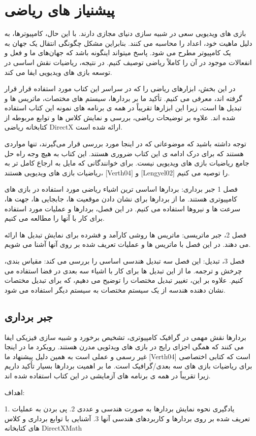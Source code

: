 
\def \Session {1}
\setcounter{chapter}{\Session-1}

\part{پیشنیاز های ریاضی}

{
بازی های ویدیویی سعی در شبیه سازی دنیای مجازی دارند.
با این حال، کامپیوترها، به دلیل ماهیت خود، اعداد را محاسبه می کنند. بنابراین مشکل چگونگی انتقال یک جهان به یک کامپیوتر مطرح می شود.
پاسخ میتواند اینگونه باشد که جهان‌های ما و فعل و انفعالات موجود در آن را کاملاً ریاضی توصیف کنیم. در نتیجه، ریاضیات نقش اساسی در توسعه بازی های ویدیویی ایفا می کند.

در این بخش، ابزارهای ریاضی را که در سراسر این کتاب مورد استفاده قرار قرار گرفته اند، معرفی می کنیم. تأکید ما بر بردارها، سیستم های مختصات، ماتریس ها و تبدیل ها است، زیرا این ابزارها تقریباً در همه ی برنامه های نمونه این کتاب استفاده شده اند.
علاوه بر توضیحات ریاضی، بررسی و نمایش کلاس ها و توابع مربوطه از کتابخانه ریاضی DirectX ارائه شده است.

توجه داشته باشید که موضوعاتی که در اینجا مورد بررسی قرار می‌گیرند، تنها مواردی هستند که برای درک ادامه ی این کتاب ضروری هستند.
این کتاب به هیچ وجه راه حل جامع ریاضیات بازی های ویدیویی نیست.
برای خوانندگانی که مایل به ارجاع کامل تر به ریاضیات بازی های ویدیویی هستند، [Verth04] و [Lengyel02] را توصیه می کنیم.
}
{
فصل 1 جبر برداری: بردارها اساسی ترین اشیاء ریاضی مورد استفاده در بازی های کامپیوتری هستند.
ما از بردارها برای نشان دادن موقعیت ها، جابجایی ها، جهت ها، سرعت ها و نیروها استفاده می کنیم.
در این فصل، بردارها و عملیات مورد استفاده برای کار با آنها را مطالعه می کنیم.

فصل 2، جبر ماتریسی: ماتریس ها روشی کارآمد و فشرده برای نمایش تبدیل ها ارائه می دهند.
در این فصل با ماتریس ها و عملیات تعریف شده بر روی آنها آشنا می شویم.

فصل 3، تبدیل: این فصل سه تبدیل هندسی اساسی را بررسی می کند: مقیاس بندی، چرخش و ترجمه.
ما از این تبدیل ها برای کار با اشیاء سه بعدی در فضا استفاده می کنیم.
علاوه بر این، تغییر تبدیل مختصات را توضیح می دهیم، که برای تبدیل مختصات نشان دهنده هندسه از یک سیستم مختصات به سیستم دیگر استفاده می شود.
}

\chapter{جبر برداری}

{
بردارها نقش مهمی در گرافیک کامپیوتری، تشخیص برخورد و شبیه سازی فیزیکی ایفا می کنند که همگی اجزای رایج در بازی های ویدئویی مدرن هستند.
رویکرد ما در اینجا غیر رسمی و عملی است به همین دلیل پیشنهاد ما [Verth04] است که کتابی اختصاصی برای ریاضیات بازی های سه بعدی/گرافیک است.
ما بر اهمیت بردارها بسیار تأکید داریم زیرا تقریباً در همه ی برنامه های آزمایشی در این کتاب استفاده شده اند.

اهداف:

1. یادگیری نحوه نمایش بردارها به صورت هندسی و عددی
2. پی بردن به عملیات تعریف شده بر روی بردارها و کاربردهای هندسی آنها
3. آشنایی با توابع برداری و کلاس های کتابخانه DirectXMath
}

